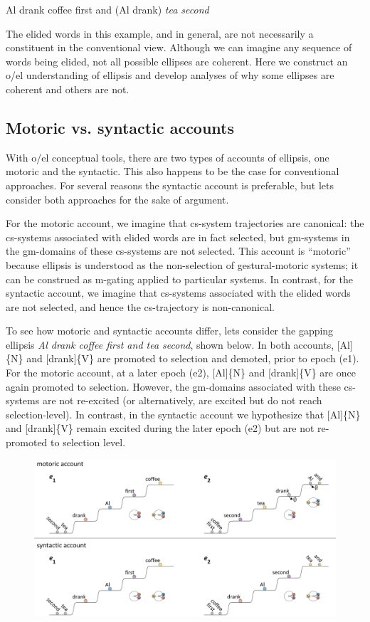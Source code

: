 \ea
  {Al drank coffee first and} (Al drank) \textit{tea second}
\z

  The elided words in this example, and in general, are not necessarily a constituent in the conventional view. Although we can imagine any sequence of words being elided, not all possible ellipses are coherent. Here we construct an o/el understanding of ellipsis and develop analyses of why some ellipses are coherent and others are not.

\subsection{Motoric vs. syntactic accounts}

With o/el conceptual tools, there are two types of accounts of ellipsis, one motoric and the syntactic. This also happens to be the case for conventional approaches. For several reasons the syntactic account is preferable, but lets consider both approaches for the sake of argument. 

  For the motoric account, we imagine that cs-system trajectories are canonical: the cs-systems associated with elided words are in fact selected, but gm-systems in the gm-domains of these cs-systems are not selected. This account is “motoric” because ellipsis is understood as the non-selection of gestural-motoric systems; it can be construed as m-gating applied to particular systems. In contrast, for the syntactic account, we imagine that cs-systems associated with the elided words are not selected, and hence the cs-trajectory is non-canonical.

  To see how motoric and syntactic accounts differ, lets consider the gapping ellipsis \textit{Al drank coffee first and tea second}, shown below. In both accounts, [Al]\{N\} and [drank]\{V\} are promoted to selection and demoted, prior to epoch (e1). For the motoric account, at a later epoch (e2), [Al]\{N\} and [drank]\{V\} are once again promoted to selection. However, the gm-domains associated with these cs-systems are not re-excited (or alternatively, are excited but do not reach selection-level). In contrast, in the syntactic account we hypothesize that [Al]\{N\} and [drank]\{V\} remain excited during the later epoch (e2) but are not re-promoted to selection level. 

  
\begin{figure}
\includegraphics[width=\textwidth]{figures/Tilsen-img145.png}
\caption{\missingcaption}
\label{fig:}
\end{figure}
 

